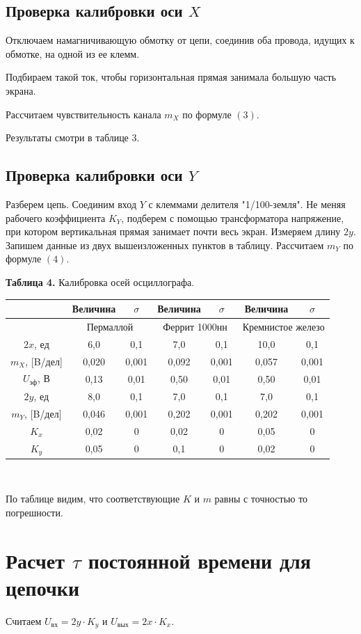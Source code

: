 \documentclass[a4paper, 12pt]{article}%
\begin{document}
\subsection*{Проверка калибровки оси $X$}
Отключаем намагничивающую обмотку от цепи, соединив оба провода, идущих к обмотке, на одной из ее клемм. 

Подбираем такой ток, чтобы горизонтальная прямая занимала большую часть экрана.

Рассчитаем чувствительность канала $m_X$ по формуле $(3)$. 

Результаты смотри в таблице 3.
\subsection*{Проверка калибровки оси $Y$}
Разберем цепь. Соединим вход $Y$ с клеммами делителя "1/100-земля". Не меняя рабочего коэффициента $K_Y$, подберем с помощью трансформатора напряжение, при котором вертикальная прямая занимает почти весь экран. Измеряем длину $2y$. Запишем данные из двух вышеизложенных пунктов в таблицу. Рассчитаем $m_Y$ по формуле $(4)$.

\begin{center}
\textbf{Таблица 4.} Калибровка осей осциллографа.
\begin{tabular}{|c|c|c|c|c|c|c|}
\hline
 & Величина & $\sigma$ & Величина & $\sigma$ & Величина & $\sigma$ \\ \hline
 & \multicolumn{2}{c|}{Пермаллой} & \multicolumn{2}{c|}{Феррит 1000нн} & \multicolumn{2}{c|}{Кремнистое железо} \\ \hline
$2x$, ед & 6,0 & 0,1 & 7,0 & 0,1 & 10,0 & 0,1 \\ \hline
$m_X$, {[}B/дел{]} & 0,020 & 0,001 & 0,092 & 0,001 & 0,057 & 0,001 \\ \hline
$U_{\text{эф}}$, В & 0,13 & 0,01 & 0,50 & 0,01 & 0,50 & 0,01 \\ \hline
$2y$, ед & 8,0 & 0,1 & 7,0 & 0,1 & 7,0 & 0,1 \\ \hline
$m_Y$, {[}B/дел{]} & 0,046 & 0,001 & 0,202 & 0,001 & 0,202 & 0,001 \\ \hline
$K_x$ & 0,02 & 0 & 0,02 & 0 & 0,05 & 0 \\ \hline
$K_y$ & 0,05 & 0 & 0,1 & 0 & 0,02 & 0 \\ \hline
\end{tabular}\\
\end{center}
По таблице видим, что соответствующие $K$ и $m$ равны с точностью то погрешности.
\section*{Расчет $\tau$ постоянной времени для цепочки}
Считаем $U_{\text{вх}} = 2y \cdot K_y$ и $U_{\text{вых}} = 2x \cdot K_x$.
\end{document}
